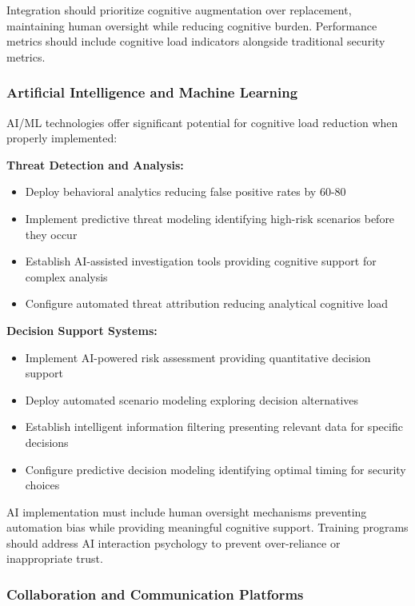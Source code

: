 \documentclass[11pt,a4paper]{article}
\begin{document}
Integration should prioritize cognitive augmentation over replacement, maintaining human oversight while reducing cognitive burden. Performance metrics should include cognitive load indicators alongside traditional security metrics.

\subsubsection{Artificial Intelligence and Machine Learning}

AI/ML technologies offer significant potential for cognitive load reduction when properly implemented:

\textbf{Threat Detection and Analysis:}
\begin{itemize}
\item Deploy behavioral analytics reducing false positive rates by 60-80%
\item Implement predictive threat modeling identifying high-risk scenarios before they occur
\item Establish AI-assisted investigation tools providing cognitive support for complex analysis
\item Configure automated threat attribution reducing analytical cognitive load
\end{itemize}

\textbf{Decision Support Systems:}
\begin{itemize}
\item Implement AI-powered risk assessment providing quantitative decision support
\item Deploy automated scenario modeling exploring decision alternatives
\item Establish intelligent information filtering presenting relevant data for specific decisions
\item Configure predictive decision modeling identifying optimal timing for security choices
\end{itemize}

AI implementation must include human oversight mechanisms preventing automation bias while providing meaningful cognitive support. Training programs should address AI interaction psychology to prevent over-reliance or inappropriate trust.

\subsubsection{Collaboration and Communication Platforms}
\end{document}
